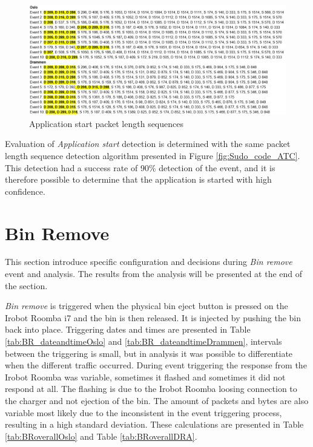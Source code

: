 \begin{figure}[H]
    \centering
    \includegraphics[width=\textwidth]{figures/Sequence_AS.png}
    \caption{Application start packet length sequences}
    \label{fig:ASseq}
\end{figure}

Evaluation of \textit{Application start} detection is determined with the same packet length sequence detection algorithm presented in Figure \ref{fig:Sudo_code_ATC}. This detection had a success rate of 90\% detection of the event, and it is therefore possible to determine that the application is started with high confidence.

\section{Bin Remove}
This section introduce specific configuration and decisions during \textit{Bin remove} event and analysis. The results from the analysis will be presented at the end of the section.

\textit{Bin remove} is triggered when the physical bin eject button is pressed on the Irobot Roomba i7 and the bin is then released. It is injected by pushing the bin back into place. Triggering dates and times are presented in Table \ref{tab:BR_dateandtimeOslo} and \ref{tab:BR_dateandtimeDrammen}, intervals between the triggering is small, but in analysis it was possible to differentiate when the different traffic occurred. During event triggering the response from the Irobot Roomba was variable, sometimes it flashed and sometimes it did not respond at all. The flashing is due to the Irobot Roomba loosing connection to the charger and not ejection of the bin. The amount of packets and bytes are also variable most likely due to the inconsistent in the event triggering process, resulting in a high standard deviation. These calculations are presented in Table \ref{tab:BRoverallOslo} and Table \ref{tab:BRoverallDRA}. 

